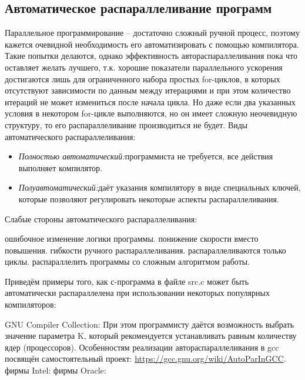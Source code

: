 \subsection{Автоматическое распараллеливание программ}

Параллельное программирование – достаточно сложный ручной процесс, поэтому кажется очевидной необходимость его автоматизировать с помощью компилятора. Такие попытки делаются, однако эффективность автораспараллеливания пока что оставляет желать лучшего, т.к. хорошие показатели параллельного ускорения достигаются лишь для ограниченного набора простых for-циклов, в которых отсутствуют зависимости по данным между итерациями и при этом количество итераций не может измениться после начала цикла. Но даже если два указанных условия в некотором for-цикле выполняются, но он имеет сложную неочевидную структуру, то его распараллеливание производиться не будет. Виды автоматического распараллеливания:

\begin{itemize}
    \item\textit{Полностью автоматический:} программиста не требуется, все действия выполняет компилятор.
    \item\textit{Полуавтоматический:} даёт указания компилятору в виде специальных ключей, которые позволяют регулировать некоторые аспекты распараллеливания.
\end{itemize}


Слабые стороны автоматического распараллеливания:

\begin{itemize}
     ошибочное изменение логики программы.
     понижение скорости вместо повышения.
     гибкости ручного распараллеливания.
     распараллеливаются только циклы.
     распараллелить программы со сложным алгоритмом работы.
\end{itemize}

Приведём примеры того, как с-программа в файле src.c может быть автоматически распараллелена при использовании некоторых популярных компиляторов:

\begin{itemize}
     GNU Compiler Collection:	 
    При этом программисту даётся возможность выбрать значение параметра K, который рекомендуется устанавливать равным количеству ядер (процессоров). Особенностям реализации автораспараллеливания в gcc посвящён самостоятельный проект: \url{https://gcc.gnu.org/wiki/AutoParInGCC}. 
     фирмы Intel:  
     фирмы Oracle: 
\end{itemize}
